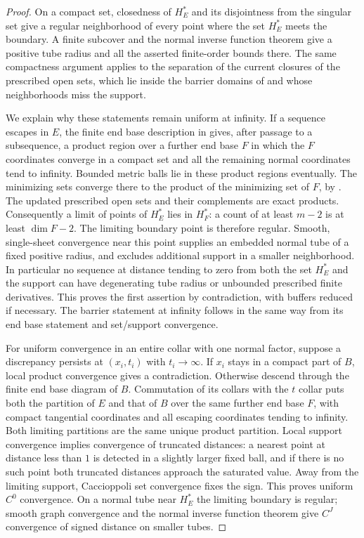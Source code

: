 \begin{proof}
On a compact set, closedness of $H_E^*$ and its disjointness from the
singular set give a regular neighborhood of every point where the set $H_E^*$
meets the boundary.  A finite subcover and the normal inverse function
theorem give a positive tube radius and all the asserted finite-order
bounds there.  The same compactness argument applies to the separation
of the current closures of the prescribed open sets, which lie inside the barrier domains of
 and whose neighborhoods miss the support.

We explain why these statements remain uniform at infinity.  If a
sequence escapes in $E$, the finite end base description in
 gives, after passage to a subsequence, a product
region over a further end base $F$ in which the $F$ coordinates converge
in a compact set and all the remaining normal coordinates tend to
infinity.  Bounded metric balls lie in these product regions eventually.
The minimizing sets converge there to the product of the minimizing set of
$F$, by .  The updated prescribed open sets and their
complements are exact products.  Consequently a limit of points of $H_E^*$
lies in $H_F^*$: a count of at least $m-2$ is at least
$\dim F-2$.  The limiting boundary point is therefore regular.
Smooth, single-sheet convergence near this point supplies an embedded
normal tube of a fixed positive radius, and excludes additional support
in a smaller neighborhood.  In particular no sequence at distance
tending to zero from both the set $H_E^*$ and the support can have degenerating
tube radius or unbounded prescribed finite derivatives.  This proves
the first assertion by contradiction, with buffers reduced if necessary.
The barrier statement at infinity follows in the same way from its
end base statement and set/support convergence.

For uniform convergence in an entire collar with one normal factor, suppose a
discrepancy persists at $(x_i,t_i)$ with $t_i\to\infty$.  If $x_i$
stays in a compact part of $B$, local product convergence gives a
contradiction.  Otherwise descend through the finite end base diagram of
$B$.  Commutation of its collars with the $t$ collar puts both the
partition of $E$ and that of $B$ over the same further end base $F$,
with compact tangential coordinates and all escaping coordinates tending
to infinity.  Both limiting partitions are the same unique product
partition.  Local support convergence implies convergence of truncated
distances: a nearest point at distance less than $1$ is detected in a
slightly larger fixed ball, and if there is no such point both truncated
distances approach the saturated value.  Away from the limiting support,
Caccioppoli set convergence fixes the sign.  This proves uniform $C^0$
convergence.  On a normal tube near $H_E^*$ the limiting boundary is regular; smooth
graph convergence and the normal inverse function theorem give $C^J$
convergence of signed distance on smaller tubes.


\end{proof}
